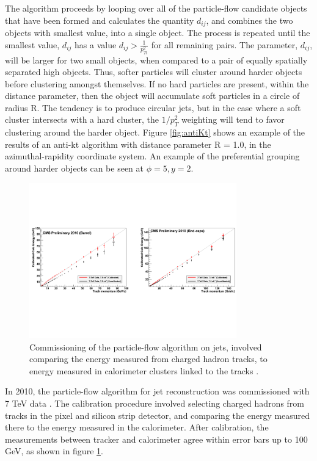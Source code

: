 \par The algorithm proceeds by looping over all of the particle-flow
candidate objects that have been formed and calculates the quantity
$d_{ij}$, and combines the two objects with smallest value, into a
single object.  The process is repeated until the smallest value,
$d_{ij}$ has a value $d_{ij} > \frac{1}{p_{Ti}^{2}}$ for all remaining
pairs.  The parameter, $d_{ij}$, will be larger for two small \PT
objects, when compared to a pair of equally spatially separated high
\PT objects.  Thus, softer particles will cluster around harder
objects before clustering amongst themselves.  If no hard particles are
present, within the distance parameter, then the object will
accumulate soft particles in a circle of radius R.  The tendency is to
produce circular jets, but in the case where a soft \PT cluster intersects
with a hard \PT cluster, the $1/p_{T}^{2}$ weighting will tend
to favor clustering around the harder \PT object.  Figure
\ref{fig:antiKt} shows an example of the results of an anti-kt
algorithm with distance parameter R = 1.0, in the azimuthal-rapidity
coordinate system.  An example of the preferential grouping around
harder \PT objects can be seen at $\phi=5, y=2$.  

\begin{figure}[h]
   \centering
  \includegraphics[width=0.8\textwidth]{Figures/Reconstruction_Diagrams/Jets__PFChargedHadronCalibration.pdf}
  \caption{Commissioning of the particle-flow algorithm on jets,
    involved comparing the energy measured from charged hadron tracks,
  to energy measured in calorimeter clusters linked to the tracks
  \cite{CMS-PAS-PFT-10-002}. } \label{fig:chargedHadron_calib}
\end{figure}

\par In 2010, the particle-flow algorithm for jet reconstruction was
commissioned with 7 TeV data \cite{CMS-PAS-PFT-10-002}.  The
calibration procedure involved selecting charged hadrons from tracks
in the pixel and silicon strip detector, and comparing the energy
measured there to the energy measured in the calorimeter.  After
calibration, the measurements between tracker and calorimeter agree
within error bars up to 100 GeV, as shown in figure
\ref{fig:chargedHadron_calib}. 

